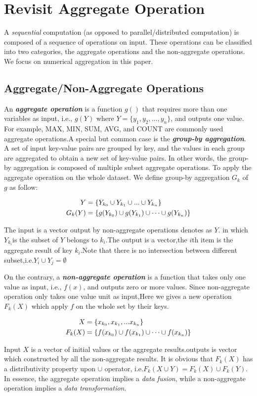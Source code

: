 \section{Revisit Aggregate Operation}
\label{sec:aggre}

A \emph{sequential} computation (as opposed to parallel/distributed computation) is composed of a sequence of operations on input. These operations can be classified into two categories, the aggregate operations and the non-aggregate operations.  We focus on numerical aggregation in this paper.
 \subsection{Aggregate/Non-Aggregate Operations}
An \emph{\textbf{aggregate operation}} is a function $g()$ that requires more than one variables as input, i.e., $g(Y)$ where $Y=\{y_1, y_2, \ldots, y_n\}$, and outputs one value. For example, MAX, MIN, SUM, AVG, and COUNT are commonly used aggregate operations.A special but common case is the \emph{\textbf{group-by aggregation}}. A set of input key-value pairs are grouped by key, and the values in each group are aggregated to obtain a new set of key-value pairs. In other words, the group-by aggregation is composed of multiple subset aggregate operations.
To apply the aggregate operation on the whole dataset. We define group-by aggregation $G_k$ of $g$ as follow: 
\begin{definition}
	\begin{align}
		 Y&=\{Y_{k_0} \cup Y_{k_1} \cup ... \cup Y_{k_n}\}\notag\\	 
	 G_k(Y)&=\{g(Y_{k_0}) \cup g(Y_{k_1}) \cup \dots \cup g(Y_{k_n})\} \notag
 \end{align}
\end{definition}

The input is a vector output by non-aggregate operations denotes as $Y$. in which $Y_{k_i}$is the subset of $Y$ belongs to $k_i$.The output is a vector,the $i$th item is the aggregate result of key $k_i$.Note that there is no intersection between different subset,i.e.$Y_i \cup Y_j = \emptyset $
 
On the contrary, a \emph{\textbf{non-aggregate operation}} is a function that takes only one value as input, i.e., $f(x)$, and outputs zero or more values. Since non-aggregate operation only takes one value unit as input,Here we gives a new operation $F_k(X)$ which apply $f$ on the whole set by their keys.
\begin{definition}
	\begin{align}
	X&=\{x_{k_0}, x_{k_1}, ... x_{k_n}\}\notag\\	 
	F_k(X)&=\{f(x_{k_0}) \cup f(x_{k_1}) \cup \dots \cup f(x_{k_n})\} \notag
	\end{align}
\end{definition}
Input $X$ is a vector of  initial values or the aggregate results.outputs is vector which constructed by all the non-aggregate results. 
 It is obvious that $F_k(X)$ has a distributivity property upon $\cup$ operator, i.e.$F_k(X \cup Y)=F_k(X) \cup F_k(Y)$.
In essence, the aggregate operation implies a \emph{data fusion}, while a non-aggregate operation implies a \emph{data transformation}.

